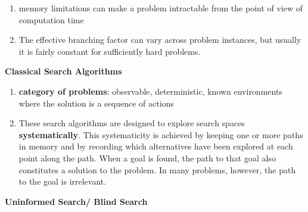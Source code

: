 \begin{enumerate}
\begin{enumerate}
        
    \end{enumerate}

    \item memory limitations can make a problem intractable from the point of view of computation time
    \hfill \cite{ai/book/Artificial-Intelligence-A-Modern-Approach/Russell-Norvig}

    \item The effective branching factor can vary across problem instances, but usually it is fairly constant for sufficiently hard problems.
    \hfill \cite{ai/book/Artificial-Intelligence-A-Modern-Approach/Russell-Norvig}
\end{enumerate}


\vspace{1cm}
{\centering\fontsize{25}{25}\selectfont\bfseries Classical Search Algorithms \par}
\vspace{0.5cm}

\begin{enumerate}
    \item \textbf{category of problems}: observable, deterministic, known environments where the solution is a sequence of actions
    \hfill \cite{ai/book/Artificial-Intelligence-A-Modern-Approach/Russell-Norvig}

    \item These search algorithms are designed to explore search spaces \textbf{systematically}. 
    This systematicity is achieved by keeping one or more paths in memory and by recording which alternatives have been explored at each point along the path. 
    When a goal is found, the path to that goal also constitutes a solution to the problem. 
    In many problems, however, the path to the goal is irrelevant.
    \hfill \cite{ai/book/Artificial-Intelligence-A-Modern-Approach/Russell-Norvig}
\end{enumerate}
\vspace{0.5cm}


\clearpage
{\centering\fontsize{22}{22}\selectfont\bfseries Uninformed Search/ Blind Search \par}
\vspace{0.5cm}













